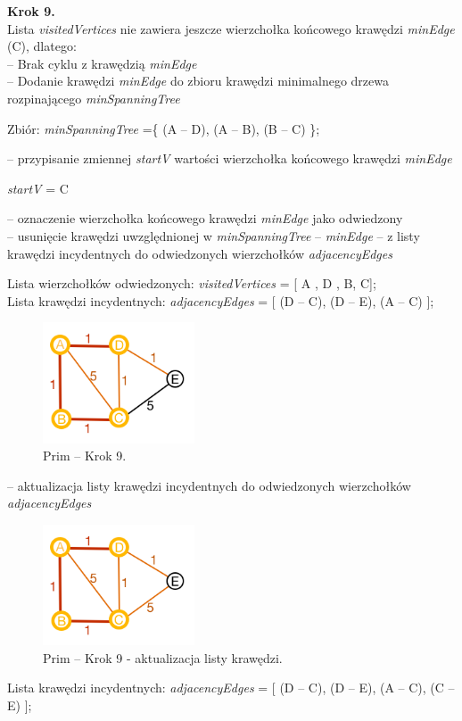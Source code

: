 \textbf{Krok 9.}\\
Lista \emph{visitedVertices} nie zawiera jeszcze wierzchołka końcowego krawędzi \emph{minEdge} (C), dlatego:\\
-- Brak cyklu z krawędzią \emph{minEdge}\\
-- Dodanie krawędzi \emph{minEdge} do zbioru krawędzi minimalnego drzewa rozpinającego \emph{minSpanningTree}
\begin{center}
	Zbiór: \emph{minSpanningTree} =\{ (A -- D), (A -- B), (B -- C) \};
\end{center}
-- przypisanie zmiennej \emph{startV} wartości wierzchołka końcowego krawędzi \emph{minEdge}
\begin{center}
	\emph{startV} = C
\end{center}
-- oznaczenie wierzchołka końcowego krawędzi \emph{minEdge } jako odwiedzony \\
-- usunięcie krawędzi uwzględnionej w \emph{minSpanningTree} -- \emph{minEdge} -- z listy krawędzi incydentnych do odwiedzonych wierzchołków \emph{adjacencyEdges}

\begin{center}
	Lista wierzchołków odwiedzonych: \emph{visitedVertices} = [ A , D , B, C];\\
	Lista krawędzi incydentnych: \emph{adjacencyEdges} = [ (D -- C), (D -- E), (A -- C) ];\\
\end{center}
\begin{figure}[htb!]
	\centering
	\includegraphics[width=0.4\textwidth]{tex/fig/graf8}
	\caption{Prim -- Krok 9.}
	\label{fig: g8}
\end{figure}
-- aktualizacja listy krawędzi incydentnych do odwiedzonych wierzchołków \emph{adjacencyEdges}
\begin{figure}[htb!]
	\centering
	\includegraphics[width=0.4\textwidth]{tex/fig/graf9}
	\caption{Prim -- Krok 9 - aktualizacja listy krawędzi.}
	\label{fig: g9}
\end{figure}
\begin{center}
	Lista krawędzi incydentnych: \emph{adjacencyEdges} = [ (D -- C), (D -- E), (A -- C), (C -- E) ];\\
\end{center}

